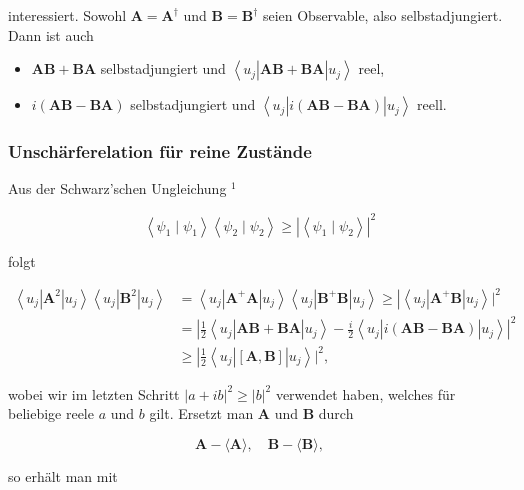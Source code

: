 \documentclass[10pt, letterpaper]{article}
\begin{document}
interessiert. Sowohl $\mathbf{A}=\mathbf{A}^{\dagger}$ und $\mathbf{B}=\mathbf{B}^{\dagger}$ seien Observable, also selbstadjungiert. Dann ist auch

\begin{itemize}
  \item $\mathbf{A B}+\mathbf{B A}$ selbstadjungiert und $\left\langle u_{j}\right| \mathbf{A B}+\mathbf{B A}\left|u_{j}\right\rangle$ reel,
  \item $i(\mathbf{A B}-\mathbf{B A})$ selbstadjungiert und $\left\langle u_{j}\right| i(\mathbf{A B}-\mathbf{B A})\left|u_{j}\right\rangle$ reell.
\end{itemize}

\subsubsection*{Unschärferelation für reine Zustände}
Aus der Schwarz'schen Ungleichung ${ }^{1}$

$$
\left\langle\psi_{1} \mid \psi_{1}\right\rangle\left\langle\psi_{2} \mid \psi_{2}\right\rangle \geq\left|\left\langle\psi_{1} \mid \psi_{2}\right\rangle\right|^{2}
$$

folgt

$$
\begin{aligned}
\left\langle u_{j}\right| \mathbf{A}^{2}\left|u_{j}\right\rangle\left\langle u_{j}\right| \mathbf{B}^{2}\left|u_{j}\right\rangle & \left.=\left\langle u_{j}\right| \mathbf{A}^{+} \mathbf{A}\left|u_{j}\right\rangle\left\langle u_{j}\right| \mathbf{B}^{+} \mathbf{B}\left|u_{j}\right\rangle \geq\left|\left\langle u_{j}\right| \mathbf{A}^{+} \mathbf{B}\right| u_{j}\right\rangle\left.\right|^{2} \\
& \left.=\left|\frac{1}{2}\left\langle u_{j}\right| \mathbf{A B}+\mathbf{B A}\right| u_{j}\right\rangle-\left.\frac{i}{2}\left\langle u_{j}\right| i(\mathbf{A B}-\mathbf{B A})\left|u_{j}\right\rangle\right|^{2} \\
& \left.\geq\left|\frac{1}{2}\left\langle u_{j}\right|[\mathbf{A}, \mathbf{B}]\right| u_{j}\right\rangle\left.\right|^{2},
\end{aligned}
$$

wobei wir im letzten Schritt $|a+i b|^{2} \geq|b|^{2}$ verwendet haben, welches für beliebige reele $a$ und $b$ gilt. Ersetzt man $\mathbf{A}$ und $\mathbf{B}$ durch

$$
\mathbf{A}-\langle\mathbf{A}\rangle, \quad \mathbf{B}-\langle\mathbf{B}\rangle,
$$

so erhält man mit
\end{document}
